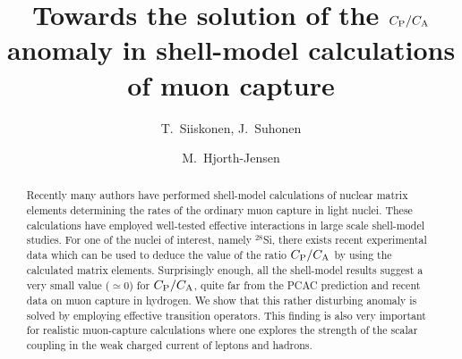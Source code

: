 \draft



\title{Towards the solution of the $C_{\rm P}/C_{\rm A}$ anomaly in
shell-model calculations of muon capture}

\author{T.\ Siiskonen, J.\ Suhonen}

\address{Department of Physics, University of Jyv\"{a}skyl\"{a},
     P.O.B.\  35, FIN-40351 Jyv\"{a}skyl\"{a}, Finland}

\author{M.\ Hjorth-Jensen}

\address{Department of Physics, University of Oslo, N-0316 Oslo, Norway}

\maketitle

\begin{abstract}
Recently many authors have performed shell-model calculations of
nuclear matrix elements
determining the rates of the ordinary muon
capture in light nuclei.
These calculations have employed well-tested
effective interactions
in large scale shell-model studies.
For one of the nuclei of interest, namely
$^{28}$Si, there exists recent experimental data which can be used to
deduce the value of the ratio $C_{\rm P}/C_{\rm A}$ by using the calculated
matrix elements. Surprisingly enough, all the shell-model results
suggest a very small value ($\simeq 0$) for $C_{\rm P}/C_{\rm A}$, quite
far from the PCAC prediction and recent data on muon capture in
hydrogen. We show that this rather
disturbing anomaly is solved by employing
effective transition operators. This finding
is also very important for realistic muon-capture calculations
where one explores the strength of the scalar coupling in the weak
charged current of leptons and hadrons.
\end{abstract}



